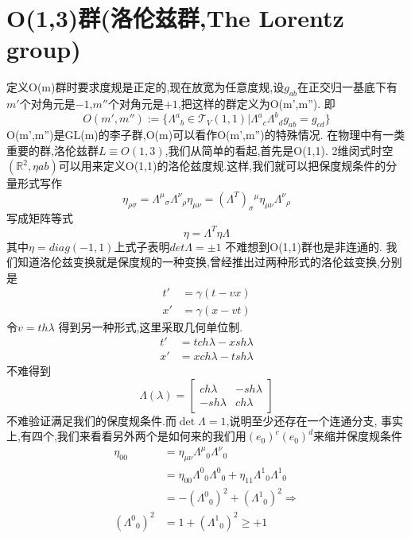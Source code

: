 \documentclass[../main.tex]{subfiles}
\begin{document}
\section{O(1,3)群(洛伦兹群,The Lorentz group)}
定义O(m)群时要求度规是正定的,现在放宽为任意度规,设$g_{ab}$在正交归一基底下有$m'$个对角元是$-1$,$m''$个对角元是$+1$,把这样的群定义为O(m',m'').
即$$O(m',m''):=\{\Lambda^a{}_b \in \mathscr{T}_V(1,1)|\Lambda^a{}_c\Lambda^b{}_d g_{ab} = g_{cd}\}$$
O(m',m'')是GL(m)的李子群,O(m)可以看作O(m',m'')的特殊情况.
在物理中有一类重要的群,洛伦兹群$L \equiv O(1,3)$,我们从简单的看起,首先是O(1,1).
2维闵式时空$(\mathbb{R}^2,\eta{ab})$可以用来定义O(1,1)的洛伦兹度规.这样,我们就可以把保度规条件的分量形式写作
$$\eta_{\rho\sigma} = \Lambda^\mu{}_\sigma \Lambda^\nu{}_\rho \eta_{\mu\nu} = (\Lambda^T)_\sigma{}^\mu\eta_{\mu\nu}\Lambda^\nu{}_\rho $$
写成矩阵等式
\begin{equation}
    \eta = \Lambda^T \eta \Lambda
    \label{洛伦兹保度规等式}
\end{equation}其中$\eta = diag(-1,1)$上式子表明$det \Lambda = \pm 1$
不难想到O(1,1)群也是非连通的.
我们知道洛伦兹变换就是保度规的一种变换,曾经推出过两种形式的洛伦兹变换,分别是
\begin{align*}
    t'& = \gamma(t - vx)\\
    x'& = \gamma(x - vt)
\end{align*}
令$v = th \lambda $ 得到另一种形式,这里采取几何单位制.
\begin{align*}
    t'&= tch \lambda - xsh\lambda\\
    x'&=xch \lambda - tsh\lambda
\end{align*}
不难得到
\begin{equation*}
    \Lambda(\lambda) = \begin{bmatrix}
       ch\lambda & - sh\lambda\\
       -sh\lambda &ch\lambda 
    \end{bmatrix}
\end{equation*}
不难验证满足我们的保度规条件.而$\det\Lambda = 1$,说明至少还存在一个连通分支,
事实上,有四个,我们来看看另外两个是如何来的我们用$(e_0)^c(e_0)^d$来缩并保度规条件
\begin{align*}
    \eta_{00} &= \eta_{\mu\nu}\Lambda^{\mu}{}_{0}\Lambda^{\nu}{}_{0}\\
              &=  \eta_{00}\Lambda^{0}{}_{0}\Lambda^{0}{}_{0} +  \eta_{11}\Lambda^{1}{}_{0}\Lambda^{1}{}_{0}\\
              &= -(\Lambda^{0}{}_{0})^2 + (\Lambda^{1}{}_{0})^2\Longrightarrow\\
    (\Lambda^{0}{}_{0})^2 &=1+ (\Lambda^{1}{}_{0})^2 \ge + 1\\
\end{align*}
\end{document}
